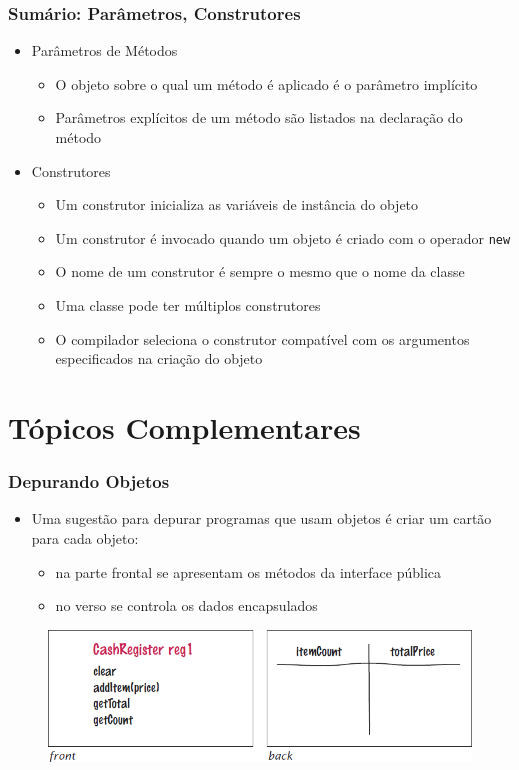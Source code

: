 \documentclass[xcolor={dvipsnames,table},aspectratio=169]{beamer}
\begin{document}
\begin{frame}\frametitle{Sumário: Parâmetros, Construtores}
\begin{itemize}
	\item Parâmetros de Métodos
	\begin{itemize}
		\item O objeto sobre o qual um método é aplicado é o parâmetro implícito
		\item Parâmetros explícitos de um método são listados na declaração do método
	\end{itemize}
	\item Construtores
	\begin{itemize}
		\item Um construtor inicializa as variáveis de instância do objeto
		\item Um construtor é invocado quando um objeto é criado com o operador \texttt{new}
		\item O nome de um construtor é sempre o mesmo que o nome da classe
		\item Uma classe pode ter múltiplos construtores
		\item O compilador seleciona o construtor compatível com os argumentos especificados na criação do objeto
	\end{itemize}
\end{itemize}
\end{frame}

\section{Tópicos Complementares}

\begin{frame}\frametitle{Depurando Objetos}
\begin{itemize}
	\item Uma sugestão para depurar programas que usam objetos é criar um cartão para cada objeto:
	\begin{itemize}
		\item na parte frontal se apresentam os métodos da interface pública
		\item no verso se controla os dados encapsulados
	\end{itemize}
\end{itemize}
\begin{figure}[h]
	\includegraphics[height=0.40\paperheight,center]{pucrs-ep-fprog-unidade_07-objetos_e_classes-laminas-depurando_objetos.png}
\end{figure}
\end{frame}
\end{document}
